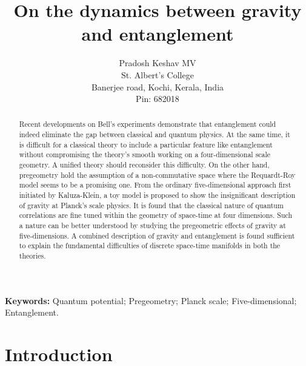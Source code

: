 \documentclass{article}
\title{On the dynamics between gravity and entanglement}
\author{Pradosh Keshav MV \\St. Albert's College\\ Banerjee road, Kochi, Kerala, India\\
 Pin: 682018 
  }
\date{}
\providecommand{\keywords}[1]
{
  \small	
  \textbf{{Keywords:}} #1
}
\begin{document}
\maketitle
\begin{abstract}
    Recent developments on Bell's experiments demonstrate that entanglement could indeed eliminate the gap between classical and quantum physics. At the same time, it is difficult for a classical theory to include a particular feature like entanglement without compromising the theory's smooth working on a four-dimensional scale geometry. A unified theory should reconsider this difficulty. On the other hand, pregeometry hold the assumption of a non-commutative space where the Requardt-Roy model seems to be a promising one.  From the ordinary five-dimensional approach first initiated by Kaluza-Klein, a toy model is proposed to show the insignificant description of gravity at Planck's scale physics. It is found that the classical nature of quantum correlations are fine tuned within the geometry of space-time at four dimensions. Such a nature can be better understood by studying the pregeometric effects of gravity at five-dimensions. A combined description of gravity and entanglement is found sufficient to explain the fundamental difficulties of discrete space-time manifolds in both the theories.
\end{abstract}
    \keywords{Quantum potential; Pregeometry; Planck scale; Five-dimensional; Entanglement.}
\newpage
\tableofcontents
\newpage
\section{Introduction}
\end{document}
